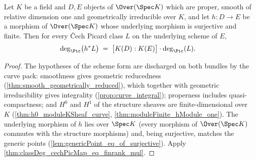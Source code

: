 \begin{theorem}
  \label{thm:classDeg_cechPicMap_of_isFinite}
  \leanok
  Let \(K\) be a field and \(D, E\) objects of \(\Over(\Spec K)\) which are proper,
  smooth of relative dimension one and geometrically irreducible over \(K\), and let
  \(h : D \to E\) be a morphism of \(\Over(\Spec K)\) whose underlying morphism is
  surjective and finite. Then for every \v Cech Picard class \(L\) on the underlying
  scheme of \(E\),
  \[
    \deg_{\Pic}\bigl(h^{*}L\bigr)
      \;=\; \bigl[K(D) : K(E)\bigr] \cdot \deg_{\Pic}(L).
  \]
\end{theorem}
\begin{proof}
  \leanok
  The hypotheses of the scheme form are discharged on both bundles by the curve pack:
  smoothness gives geometric reducedness (\ref{thm:smooth_geometrically_reduced}),
  which together with geometric irreducibility gives integrality
  (\ref{prop:curve_integral}); properness includes quasi-compactness; and \(H^0\) and
  \(H^1\) of the structure sheaves are finite-dimensional over \(K\)
  (\ref{thm:h0_moduleKSheaf_curve}, \ref{thm:moduleFinite_hModule_one}). The
  underlying morphism of \(h\) lies over \(\Spec K\) (every morphism of
  \(\Over(\Spec K)\) commutes with the structure morphisms) and, being surjective,
  matches the generic points (\ref{lem:genericPoint_eq_of_surjective}). Apply
  \ref{thm:classDeg_cechPicMap_eq_finrank_mul}.
\end{proof}

